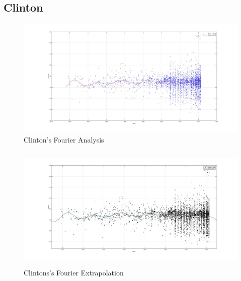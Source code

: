 \documentclass[twoside]{article}
\begin{document}
\subsection{Clinton}
\begin{figure}[H]
  \centering
    \includegraphics[width=\textwidth]{images/fourier/clinton.jpg}
    \caption{Clinton's Fourier Analysis}
\end{figure}
 \begin{figure}[H]
   \centering
     \includegraphics[width=\textwidth,height=6cm]{images/fourier/clintonlarge.jpg}
     \caption{Clintons's Fourier Extrapolation}
 \end{figure}
\end{document}
